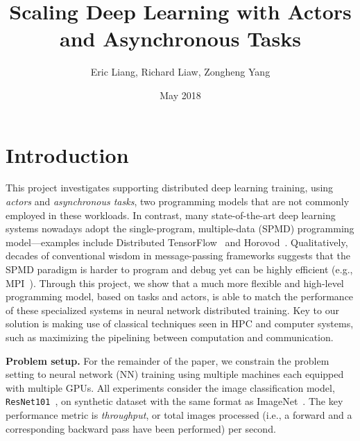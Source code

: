 \documentclass{article}
\title{Scaling Deep Learning with Actors and Asynchronous Tasks}
\author{Eric Liang, Richard Liaw, Zongheng Yang}
\date{May 2018}
\begin{document}
\maketitle







\section{Introduction}
This project investigates supporting distributed deep learning training, using \textit{actors} and \textit{asynchronous tasks}, two programming models that are not commonly employed in these workloads.  In contrast, many state-of-the-art deep learning systems nowadays adopt the single-program, multiple-data (SPMD) programming model---examples include Distributed TensorFlow~\cite{tensorflow-osdi16} and Horovod~\cite{horovod}.  Qualitatively, decades of conventional wisdom in message-passing frameworks suggests that the SPMD paradigm is harder to program and debug yet can be highly efficient (e.g., MPI~\cite{MPI}).  Through this project, we show that a much more flexible and high-level programming model, based on tasks and actors, is able to match the performance of these specialized systems in neural network distributed training.  Key to our solution is making use of classical techniques seen in HPC and computer systems, such as maximizing the pipelining between computation and communication.

{\bf Problem setup.} For the remainder of the paper, we constrain the problem setting to neural network (NN) training using multiple machines each equipped with multiple GPUs.  All experiments consider the image classification model, \texttt{ResNet101}~\cite{resnet}, on synthetic dataset with the same format as ImageNet~\cite{imagenet}.  The key performance metric is \textit{throughput}, or total images processed (i.e., a forward and a corresponding backward pass have been performed) per second.
\end{document}
